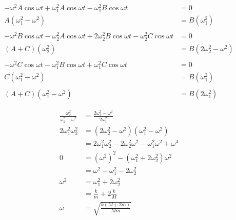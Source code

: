 \documentclass{article}
\begin{document}
\begin{enumerate}
        \begin{align*}
          -\omega^2 A \cos \omega t + \omega_1^2 A \cos \omega t - \omega_1^2 B \cos \omega t                                & = 0                           \\
          A (\omega_1^2 - \omega^2)                                                                                          & = B (\omega_1^2)              \\ \\
          -\omega^2 B \cos \omega t - \omega_2^2 A \cos \omega t + 2 \omega_2^2 B \cos \omega t - \omega_2^2 C \cos \omega t & = 0                           \\
          (A + C) (\omega_2^2)                                                                                               & = B (2 \omega_2^2 - \omega^2) \\ \\
          -\omega^2 C \cos \omega t - \omega_1^2 B \cos \omega t + \omega_1^2 C \cos \omega t                                & = 0                           \\
          C (\omega_1^2 - \omega^2)                                                                                          & = B (\omega_1^2)              \\ \\
          (A + C)(\omega_1^2 - \omega^2)                                                                                     & = B (2 \omega_1^2)
        \end{align*}

        \begin{align*}
          \frac{\omega_2^2}{\omega_1^2 - \omega^2} & = \frac{2 \omega_2^2 - \omega^2}{2 \omega_1^2}                                     \\
          2 \omega_1^2 \omega_2^2                  & = (2 \omega_2^2 - \omega^2)(\omega_1^2 - \omega^2)                                 \\
                                                   & = 2 \omega_1^2 \omega_2^2 - 2 \omega_2^2 \omega^2 - \omega_1^2 \omega^2 + \omega^4 \\
          0                                        & = (\omega^2)^2 - (\omega_1^2 + 2 \omega_2^2) \omega^2                              \\
                                                   & = \omega^2 - \omega_1^2 - 2 \omega_2^2                                             \\
          \omega^2                                 & = \omega_1^2 + 2 \omega_2^2                                                        \\
                                                   & = \frac{k}{m} + 2 \frac{k}{M}                                                      \\
          \omega                                   & = \sqrt{\frac{k (M + 2 m)}{M m}}
        \end{align*}


\end{enumerate}
\end{document}
